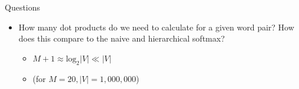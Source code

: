 
\begin{vbframe}{Questions}

\vfill

\begin{itemize}
	\item \ques How many dot products do we need to calculate for a given word pair? How does this compare to the naive and hierarchical softmax?
		\begin{itemize}
			\item $M+1 \approx \mathrm{log}_2 |V| \ll |V|$
			\item[] (for $M=20, |V| = 1,000,000$)
		\end{itemize}
\end{itemize}

\vfill

\end{vbframe}


